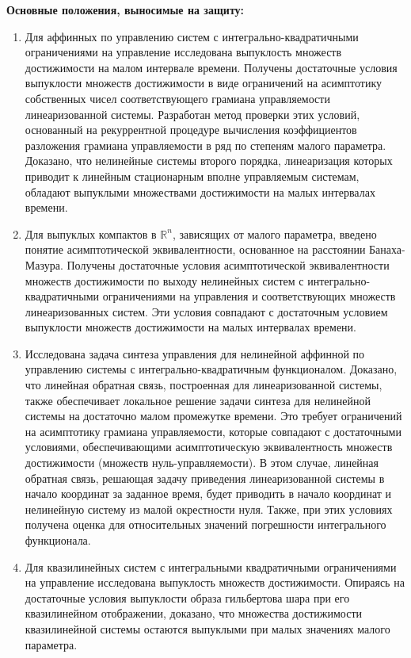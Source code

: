 \documentclass[../main.tex]{subfiles}
\begin{document}
\textbf{Основные положения, выносимые на защиту:} 
\begin{enumerate}
	\item Для аффинных по управлению систем с интегрально-квадратичными ограничениями на управление исследована выпуклость множеств достижимости на малом интервале времени.
	Получены достаточные условия выпуклости множеств достижимости в виде ограничений на асимптотику собственных чисел соответствующего грамиана управляемости линеаризованной системы.
	Разработан метод проверки этих условий, основанный на рекуррентной процедуре вычисления коэффициентов разложения грамиана управляемости в ряд по степеням малого параметра.
	Доказано, что нелинейные системы второго порядка, линеаризация которых приводит к линейным стационарным вполне управляемым системам, обладают выпуклыми множествами достижимости на малых интервалах времени.
	
	\item Для выпуклых компактов в $\mathbb{R}^n$, зависящих от малого параметра, введено понятие асимптотической эквивалентности, основанное на расстоянии Банаха-Мазура.
	Получены достаточные условия асимптотической эквивалентности множеств достижимости по выходу нелинейных систем с интегрально-квадратичными ограничениями на управления и соответствующих множеств линеаризованных систем. 
	Эти условия совпадают с достаточным условием выпуклости множеств достижимости на малых интервалах времени.
	
	\item Исследована задача синтеза управления для нелинейной аффинной по управлению системы с интегрально-квадратичным функционалом. 
	Доказано, что линейная обратная связь, построенная для линеаризованной системы, также обеспечивает локальное решение задачи синтеза для нелинейной системы на достаточно малом промежутке времени.  
	Это требует ограничений на асимптотику грамиана управляемости, которые совпадают с достаточными условиями, обеспечивающими асимптотическую эквивалентность множеств достижимости (множеств нуль-управляемости). 
	В этом случае, линейная обратная связь, решающая задачу приведения линеаризованной системы в начало координат за заданное время, будет приводить в начало координат и нелинейную систему из малой окрестности нуля.
	Также, при этих условиях получена оценка для относительных значений погрешности интегрального функционала. 
	
	\item Для квазилинейных систем с интегральными квадратичными ограничениями на управление исследована выпуклость множеств достижимости. 
	Опираясь на достаточные условия выпуклости образа гильбертова шара при его квазилинейном отображении, доказано, что множества достижимости квазилинейной системы остаются выпуклыми при малых значениях малого параметра. 
\end{enumerate}
\end{document}
